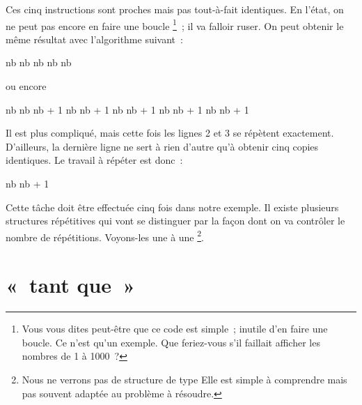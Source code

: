 		Ces cinq instructions sont proches mais pas tout-à-fait identiques. 
		En l’état, on ne peut pas encore en faire une boucle%
		\footnote{%
			Vous vous dites peut-être que ce code est simple~;
			inutile d’en faire une boucle.
			Ce n’est qu’un exemple.
			Que feriez-vous s’il faillait afficher les nombres
			de 1 à 1000~?
		}~;
		il va falloir ruser.
		On peut obtenir le même résultat avec l’algorithme suivant~:

		\begin{minipage}{4cm}
		\begin{LDA}
		\Let nb 
		\Let nb 
		\Let nb 
		\Let nb 
		\Let nb 
		\end{LDA}
		\end{minipage}
		\quad ou encore \quad
		\begin{minipage}{4cm}
		\begin{LDA}[1]
		\Let nb \Gets 1
		\Write{nb}
		\Let nb \Gets nb + 1
		\Write{nb}
		\Let nb \Gets nb + 1
		\Write{nb}
		\Let nb \Gets nb + 1
		\Write{nb}
		\Let nb \Gets nb + 1
		\Write{nb}
		\Let nb \Gets nb + 1
		\end{LDA}
		\end{minipage}
		
		Il est plus compliqué,
		mais cette fois les lignes 2 et 3 se répètent exactement.
		D’ailleurs, la dernière ligne ne sert à rien d’autre qu’à
		obtenir cinq copies identiques.
		Le travail à répéter est donc~:

		\begin{LDA}
		\Let nb \Gets nb + 1
		\end{LDA}

		Cette tâche doit être effectuée cinq fois dans notre exemple.
		Il existe plusieurs structures répétitives
		qui vont se distinguer par la façon dont on va
		contrôler le nombre de répétitions.
		Voyons-les une à une%
		\footnote{%
			Nous ne verrons pas de structure de type
			Elle est simple à comprendre
			mais pas souvent adaptée au problème à résoudre.
		}.

\clearpage
\section{«~tant que~»}
	

